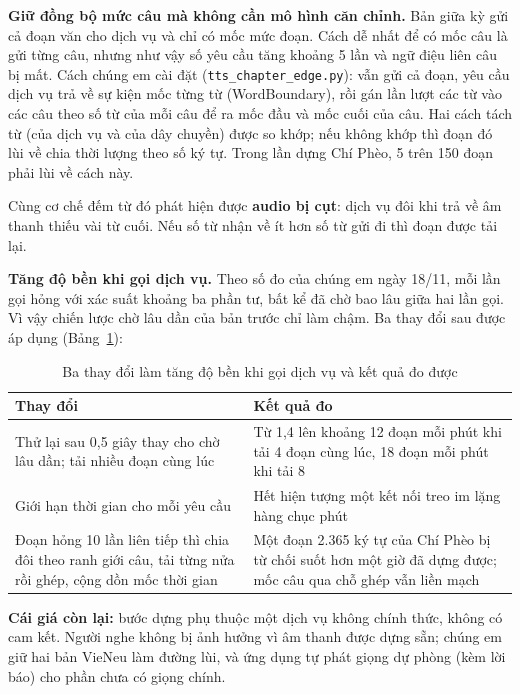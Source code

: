 \documentclass[12pt,a4paper]{article}
\begin{document}
\textbf{Giữ đồng bộ mức câu mà không cần mô hình căn chỉnh.} Bản giữa kỳ gửi cả đoạn văn cho dịch vụ và chỉ có mốc mức đoạn. Cách dễ nhất để có mốc câu là gửi từng câu, nhưng như vậy số yêu cầu tăng khoảng 5 lần và ngữ điệu liên câu bị mất. Cách chúng em cài đặt (\texttt{tts\_chapter\_edge.py}): vẫn gửi cả đoạn, yêu cầu dịch vụ trả về sự kiện mốc từng từ (WordBoundary), rồi gán lần lượt các từ vào các câu theo số từ của mỗi câu để ra mốc đầu và mốc cuối của câu. Hai cách tách từ (của dịch vụ và của dây chuyền) được so khớp; nếu không khớp thì đoạn đó lùi về chia thời lượng theo số ký tự. Trong lần dựng Chí Phèo, 5 trên 150 đoạn phải lùi về cách này.

Cùng cơ chế đếm từ đó phát hiện được \textbf{audio bị cụt}: dịch vụ đôi khi trả về âm thanh thiếu vài từ cuối. Nếu số từ nhận về ít hơn số từ gửi đi thì đoạn được tải lại.

\textbf{Tăng độ bền khi gọi dịch vụ.} Theo số đo của chúng em ngày 18/11, mỗi lần gọi hỏng với xác suất khoảng ba phần tư, bất kể đã chờ bao lâu giữa hai lần gọi. Vì vậy chiến lược chờ lâu dần của bản trước chỉ làm chậm. Ba thay đổi sau được áp dụng (Bảng~\ref{tab:do-ben}):

{\small
\begin{longtable}[]{@{}>{\raggedright\arraybackslash}p{7.2cm}>{\raggedright\arraybackslash}p{7.6cm}@{}}
\caption{Ba thay đổi làm tăng độ bền khi gọi dịch vụ và kết quả đo được}\label{tab:do-ben}\\
\toprule\noalign{}
Thay đổi & Kết quả đo \\
\midrule\noalign{}
\endhead
\bottomrule\noalign{}
\endlastfoot
Thử lại sau 0,5 giây thay cho chờ lâu dần; tải nhiều đoạn cùng lúc & Từ 1,4 lên khoảng 12 đoạn mỗi phút khi tải 4 đoạn cùng lúc, 18 đoạn mỗi phút khi tải 8 \\
Giới hạn thời gian cho mỗi yêu cầu & Hết hiện tượng một kết nối treo im lặng hàng chục phút \\
Đoạn hỏng 10 lần liên tiếp thì chia đôi theo ranh giới câu, tải từng nửa rồi ghép, cộng dồn mốc thời gian & Một đoạn 2.365 ký tự của Chí Phèo bị từ chối suốt hơn một giờ đã dựng được; mốc câu qua chỗ ghép vẫn liền mạch \\
\end{longtable}
}

\textbf{Cái giá còn lại:} bước dựng phụ thuộc một dịch vụ không chính thức, không có cam kết. Người nghe không bị ảnh hưởng vì âm thanh được dựng sẵn; chúng em giữ hai bản VieNeu làm đường lùi, và ứng dụng tự phát giọng dự phòng (kèm lời báo) cho phần chưa có giọng chính.
\end{document}

